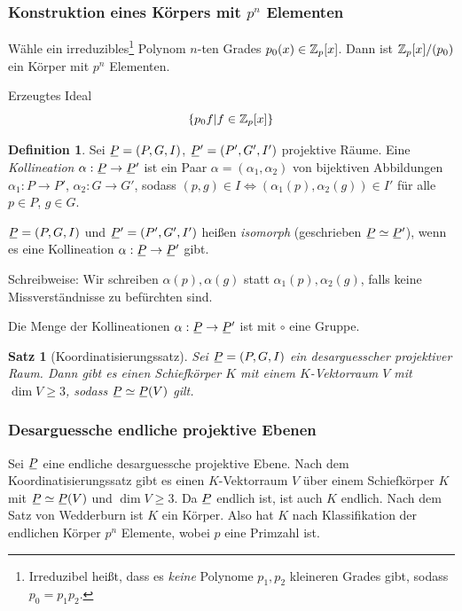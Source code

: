 \documentclass[
 a4paper,
 12pt,
 parskip=half
 ]{scrartcl}
\theoremstyle{plain}
\newtheorem*{thm*}{Satz}
\theoremstyle{definition}
\newtheorem*{defn*}{Definition}
\begin{document}
\subsubsection*{Konstruktion eines Körpers mit \texorpdfstring{$p^n$}{p hoch n} Elementen}
Wähle ein irreduzibles\footnote{Irreduzibel heißt, dass es \emph{keine} Polynome $p_1, p_2$ kleineren Grades gibt, sodass $p_0 = p_1 p_2$.} Polynom $n$-ten Grades $p_0(x) \in \mathbb{Z}_p[x]$. Dann ist $\mathbb{Z}_p[x] / (p_0)$ ein Körper mit $p^n$ Elementen.

Erzeugtes Ideal
\[ \{ p_0 f | f \in \mathbb{Z}_p[x] \} \]

\begin{defn*}
 Sei $\proj = (P,G,I)$, $\proj' = (P',G',I')$ projektive Räume. Eine \emph{Kollineation} $\alpha: \proj \to \proj'$ ist ein Paar $\alpha = (\alpha_1, \alpha_2)$ von bijektiven Abbildungen $\alpha_1:P \to P'$, $\alpha_2: G \to G'$, sodass $(p,g) \in I \Leftrightarrow (\alpha_1(p), \alpha_2(g) ) \in I'$ für alle $p \in P$, $g \in G$. 
 
 $\proj=(P,G,I)$ und $\proj' = (P', G', I')$ heißen \emph{isomorph} (geschrieben $\proj \simeq \proj'$), wenn es eine Kollineation $\alpha: \proj \to \proj'$ gibt.
 
 Schreibweise: Wir schreiben $\alpha(p), \alpha(g)$ statt $\alpha_1(p), \alpha_2(g)$, falls keine Missverständnisse zu befürchten sind.
\end{defn*}

\begin{bem}
 Die Menge der Kollineationen $\alpha: \proj \to \proj'$ ist mit $\circ$ eine Gruppe.
\end{bem}

\begin{thm*}[Koordinatisierungssatz]
 Sei $\proj = (P,G,I)$ ein desarguesscher projektiver Raum. Dann gibt es einen Schiefkörper $K$ mit einem $K$-Vektorraum $V$ mit $\dim V \ge 3$, sodass $\proj \simeq \proj(V)$ gilt.
\end{thm*}

\subsubsection*{Desarguessche endliche projektive Ebenen}
Sei $\proj$ eine endliche desarguessche projektive Ebene. Nach dem Koordinatisierungssatz gibt es einen $K$-Vektorraum $V$ über einem Schiefkörper $K$ mit $\proj \simeq \proj(V)$ und $\dim V \ge 3$. Da $\proj$ endlich ist, ist auch $K$ endlich. Nach dem Satz von Wedderburn ist $K$ ein Körper. Also hat $K$ nach Klassifikation der endlichen Körper $p^n$ Elemente, wobei $p$ eine Primzahl ist.
\end{document}
